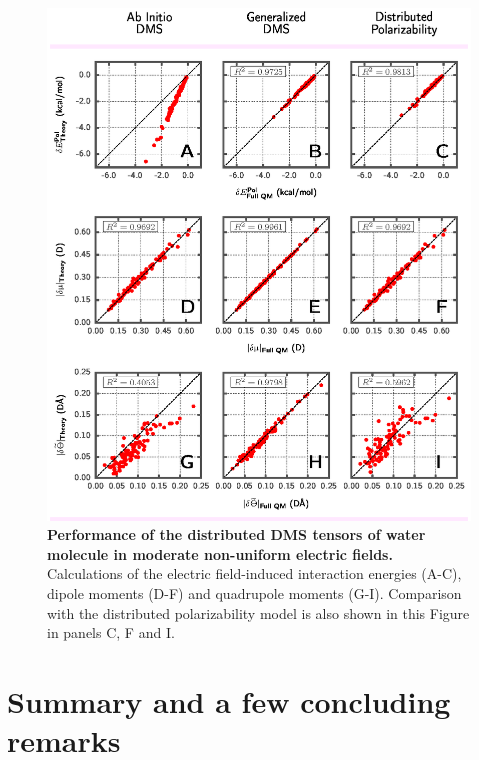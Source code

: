 \documentclass[aip,amsmath,amssymb,reprint,floatfix]{revtex4-1}
\begin{document}
\begin{figure}[h]
\includegraphics[width=\textwidth]{data/dmatpol/water/figure1/fig-2.eps}
\caption{\label{f:fig-2} {\bf Performance of the distributed DMS tensors of water molecule in moderate
non\hyp{}uniform electric fields.}
Calculations of the electric field\hyp{}induced interaction energies (A-C), dipole moments (D-F) and
quadrupole moments (G-I). Comparison with the distributed polarizability model is also shown in this Figure
in panels C, F and I.}
\end{figure}

\section{\label{s:5}Summary and a few concluding remarks}
\end{document}
